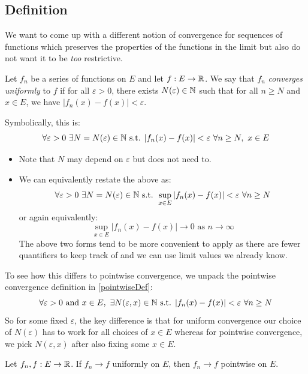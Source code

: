 \documentclass[../main.tex]{subfiles}
\begin{document}
\subsection{Definition}
We want to come up with a different notion of convergence for sequences of functions which preserves the properties of the functions in the limit but also do not want it to be \textit{too} restrictive.
\begin{definition}
  Let $f_n$ be a series of functions on $E$ and let $f: E \to \mathbb{R}$.
  We say that $f_n$ \textit{converges uniformly} to $f$ if for all $\varepsilon > 0$, there exists $N(\varepsilon) \in \mathbb{N}$ such that for all $n \geq N$ and $x \in E$, we have $|f_n(x) - f(x)| < \varepsilon$.

  Symbolically, this is:
  \[
    \forall \varepsilon > 0\ \exists N = N(\varepsilon) \in \mathbb{N} \text{ s.t. } |f_n(x) - f(x)| < \varepsilon\ \forall n \geq N,\ x \in E
  \]
\end{definition}
\begin{remark}[Remarks]
  \begin{itemize}
    \item Note that $N$ may depend on $\varepsilon$ but does not need to.
    \item We can equivalently restate the above as:
      \[
        \forall \varepsilon > 0\ \exists N = N(\varepsilon) \in \mathbb{N} \text{ s.t. } \sup_{x \in E} |f_n(x) - f(x)| < \varepsilon\ \forall n \geq N
      \]
      or again equivalently:
      \[
        \sup_{x \in E} |f_n(x) - f(x)| \to 0 \text{ as $n \to \infty$}
      \]
      The above two forms tend to be more convenient to apply as there are fewer quantifiers to keep track of and we can use limit values we already know.
  \end{itemize}
\end{remark}
To see how this differs to pointwise convergence, we unpack the pointwise convergence definition in \cref{pointwiseDef}:
\[
  \forall \varepsilon > 0 \text{ and } x \in E,\ \exists N(\varepsilon, x) \in \N \text{ s.t. } |f_n(x) - f(x)| < \varepsilon \ \forall n \geq N
\]
So for some fixed $\varepsilon$, the key difference is that for uniform convergence our choice of $N(\varepsilon)$ has to work for all choices of $x \in E$ whereas for pointwise convergence, we pick $N(\varepsilon, x)$ after also fixing some $x \in E$.
\begin{proposition}
  Let $f_n, f: E \to \mathbb{R}$.
  If $f_n \to f$ uniformly on $E$, then $f_n \to f$ pointwise on $E$. \label{unifImpPoint}
\end{proposition}
\end{document}
